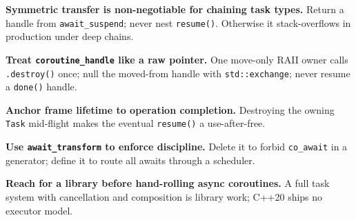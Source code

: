 \textbf{Symmetric transfer is non-negotiable for chaining task types.} Return a handle from \texttt{await\_suspend}; never nest \texttt{resume()}. Otherwise it stack-overflows in production under deep chains.

\textbf{Treat \texttt{coroutine\_handle} like a raw pointer.} One move-only RAII owner calls \texttt{.destroy()} once; null the moved-from handle with \texttt{std::exchange}; never resume a \texttt{done()} handle.

\textbf{Anchor frame lifetime to operation completion.} Destroying the owning \texttt{Task} mid-flight makes the eventual \texttt{resume()} a use-after-free.

\textbf{Use \texttt{await\_transform} to enforce discipline.} Delete it to forbid \texttt{co\_await} in a generator; define it to route all awaits through a scheduler.

\textbf{Reach for a library before hand-rolling async coroutines.} A full task system with cancellation and composition is library work; C++20 ships no executor model.
